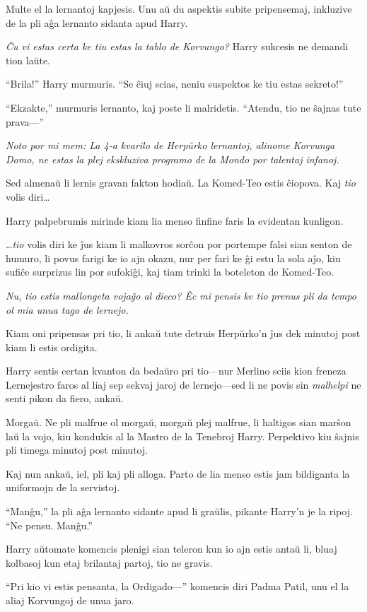 Multe el la lernantoj kapjesis. Unu aŭ du aspektis subite pripensemaj,
inkluzive de la pli aĝa lernanto sidanta apud Harry.

\emph{Ĉu vi estas certa ke tiu estas la tablo de Korvungo?} Harry
sukcesis ne demandi tion laŭte.

``Brila!'' Harry murmuris. ``Se ĉiuj scias, neniu suspektos ke tiu
estas sekreto!''

``Ekzakte,'' murmuris lernanto, kaj poste li malridetis. ``Atendu, tio
ne ŝajnas tute prava—''

\emph{Noto por mi mem: La 4-a kvarilo de Herpŭrko lernantoj, alinome
Korvunga Domo, ne estas la plej ekskluziva programo de la Mondo por
talentaj infanoj.}

Sed almenaŭ li lernis gravan fakton hodiaŭ. La Komed-Teo estis
ĉiopova. Kaj \emph{tio} volis diri\ldots

Harry palpebrumis mirinde kiam lia menso finfine faris la evidentan
kunligon.

\ldots \emph{tio} volis diri ke ĵus kiam li malkovros sorĉon por
portempe falsi sian senton de humuro, li povus farigi ke io ajn okazu,
nur per fari ke ĝi estu la sola aĵo, kiu sufiĉe surprizus lin por
sufokiĝi, kaj tiam trinki la boteleton de Komed-Teo.

\emph{Nu, tio estis mallongeta vojaĝo al dieco? Êc mi pensis ke tio
  prenus pli da tempo ol mia unua tago de lernejo.}

Kiam oni pripensas pri tio, li ankaŭ tute detruis Herpŭrko'n ĵus dek
minutoj post kiam li estis ordigita.

Harry sentis certan kvanton da bedaŭro pri tio—nur Merlino sciis kion
freneza Lernejestro faros al liaj sep sekvaj jaroj de lernejo—sed li
ne povis sin \emph{malhelpi} ne senti pikon da fiero, ankaŭ.

Morgaŭ. Ne pli malfrue ol morgaŭ, morgaŭ plej malfrue, li haltigos
sian marŝon laŭ la vojo, kiu kondukis al la Mastro de la Tenebroj
Harry. Perpektivo kiu ŝajnis pli timega minutoj post minutoj.

Kaj nun ankaŭ, iel, pli kaj pli alloga. Parto de lia menso estis jam
bildiganta la uniformojn de la servistoj.

``Manĝu,'' la pli aĝa lernanto sidante apud li graŭlis, pikante
Harry'n je la ripoj. ``Ne pensu. Manĝu.''

Harry aŭtomate komencis plenigi sian teleron kun io ajn estis antaŭ
li, bluaj kolbasoj kun etaj brilantaj partoj, tio ne gravis.

``Pri kio vi estis pensanta, la Ordigado—'' komencis diri Padma Patil,
unu el la aliaj Korvungoj de unua jaro.


